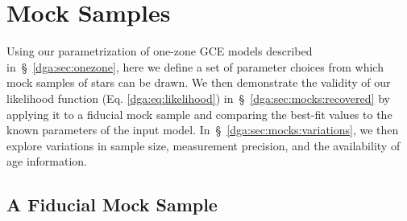 
\section{Mock Samples}
\label{dga:sec:mocks}

Using our parametrization of one-zone GCE models described
in~\S~\ref{dga:sec:onezone}, here we define a set of parameter choices from which
mock samples of stars can be drawn.
We then demonstrate the validity of our likelihood function (Eq.
\ref{dga:eq:likelihood}) in~\S~\ref{dga:sec:mocks:recovered} by applying it to a
fiducial mock sample and comparing the best-fit values to the known parameters
of the input model.
In~\S~\ref{dga:sec:mocks:variations}, we then explore variations in sample size,
measurement precision, and the availability of age information.

\subsection{A Fiducial Mock Sample}
\label{dga:sec:mocks:fiducial}

